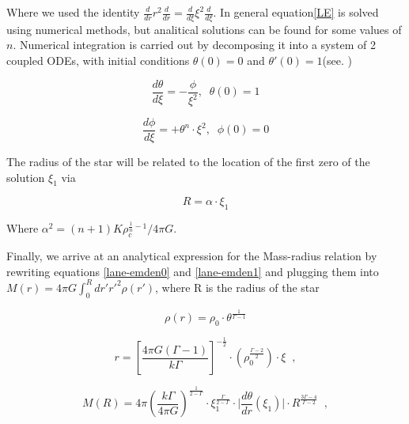 Where we used the identity  $\frac{d}{dr} r^2 \frac{d}{dr} = \frac{d}{d\xi} \xi^2 \frac{d}{d\xi} $. In general equation\ref{LE} is solved using numerical methods, but analitical solutions can be found for some values of $n$. Numerical integration is carried out by decomposing it into a system of 2 coupled ODEs, with initial conditions $\theta(0)=0$ and $\theta'(0)=1$(see. \cite{Shapiro:1983du})

\begin{equation}
\frac{d \theta}{d\xi} = -\frac{\phi}{\xi^2}, \;\; \theta(0)=1
\end{equation}

\begin{equation}
\frac{d \phi}{d\xi} = + \theta^n \cdot \xi^2, \;\; \phi(0)=0 
\end{equation}

The radius of the star will be related to the location of the first zero of the solution $\xi_1$ via 

\begin{equation}
R = \alpha \cdot \xi_1
\end{equation}

Where $\alpha^2=(n+1)K\rho_c^{\frac{1}{n}-1}/4\pi G$.


Finally, we arrive at an analytical expression for the Mass-radius relation by rewriting equations \ref{lane-emden0} and \ref{lane-emden1} and plugging them into $M(r) = 4\pi G \int_0^R dr' r'^2 \rho(r') $, where R is the radius of the star

\begin{equation}\label{lane-emden2}
\rho(r) = \rho_0 \cdot \theta^{\frac{1}{\Gamma -1}} 
\end{equation}

\begin{equation}\label{lane-emden3}
r = \left[ \frac{4\pi G (\Gamma-1)}{k \Gamma} \right]^{-\frac{1}{2}} \cdot \left( \rho_0^{\frac{\Gamma-2}{2}} \right) \cdot \xi \;\; ,
\end{equation}

\begin{equation}\label{M-R}
M(R) = 4\pi \left( \frac{k \Gamma}{4\pi G} \right)^{\frac{1}{2-\Gamma}}\cdot \xi_1^{\frac{\Gamma}{2-\Gamma}} \cdot \Biggr| \frac{d\theta}{dr} (\xi_1) \Biggr| \cdot R^{\frac{3\Gamma -4}{\Gamma-2}} \;\; ,
\end{equation}


